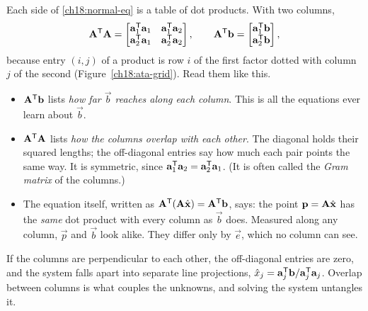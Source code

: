 Each side of \eqref{ch18:normal-eq} is a table of dot products. With two columns,
\[
  \mathbf{A}^{\mathsf{T}}\mathbf{A} =
  \begin{bmatrix}
    \mathbf{a}_1^{\mathsf{T}}\mathbf{a}_1 & \mathbf{a}_1^{\mathsf{T}}\mathbf{a}_2\\
    \mathbf{a}_2^{\mathsf{T}}\mathbf{a}_1 & \mathbf{a}_2^{\mathsf{T}}\mathbf{a}_2
  \end{bmatrix},
  \qquad
  \mathbf{A}^{\mathsf{T}}\mathbf{b} =
  \begin{bmatrix} \mathbf{a}_1^{\mathsf{T}}\mathbf{b} \\ \mathbf{a}_2^{\mathsf{T}}\mathbf{b} \end{bmatrix},
\]
because entry $(i,j)$ of a product is row $i$ of the first factor dotted with column $j$ of the
second (Figure~\ref{ch18:ata-grid}). Read them like this.
\begin{itemize}
  \item $\mathbf{A}^{\mathsf{T}}\mathbf{b}$ lists \emph{how far $\vec{b}$ reaches along each column}. This is all
        the equations ever learn about $\vec{b}$.
  \item $\mathbf{A}^{\mathsf{T}}\mathbf{A}$ lists \emph{how the columns overlap with each other}. The diagonal holds
        their squared lengths; the off-diagonal entries say how much each pair points the same way.
        It is symmetric, since $\mathbf{a}_1^{\mathsf{T}}\mathbf{a}_2=\mathbf{a}_2^{\mathsf{T}}\mathbf{a}_1$. (It is often called
        the \emph{Gram matrix} of the columns.)
  \item The equation itself, written as $\mathbf{A}^{\mathsf{T}}(\mathbf{A}\hat{\mathbf{x}})=\mathbf{A}^{\mathsf{T}}\mathbf{b}$, says:
        the point $\mathbf{p}=\mathbf{A}\hat{\mathbf{x}}$ has the \emph{same} dot product with every column
        as $\vec{b}$ does. Measured along any column, $\vec{p}$ and $\vec{b}$ look alike. They
        differ only by $\vec{e}$, which no column can see.
\end{itemize}
If the columns are perpendicular to each other, the off-diagonal entries are zero, and the system
falls apart into separate line projections, $\hat{x}_j=\mathbf{a}_j^{\mathsf{T}}\mathbf{b}/\mathbf{a}_j^{\mathsf{T}}\mathbf{a}_j$.
Overlap between columns is what couples the unknowns, and solving the system untangles it.

